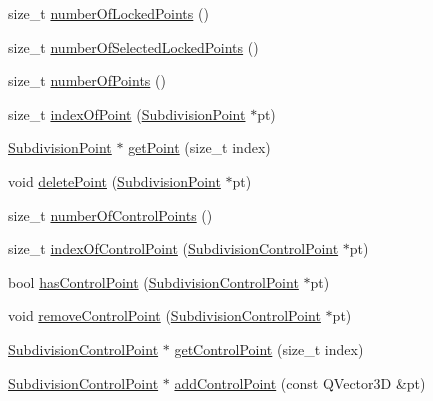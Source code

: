 \begin{DoxyCompactItemize}
\item 
size\-\_\-t \hyperlink{classShipCAD_1_1SubdivisionSurface_a771f0f1881a2da57dde8cb88a8fc9059}{number\-Of\-Locked\-Points} ()
\item 
size\-\_\-t \hyperlink{classShipCAD_1_1SubdivisionSurface_a2583bc0013b5725ac0902062d1c8bcea}{number\-Of\-Selected\-Locked\-Points} ()
\item 
size\-\_\-t \hyperlink{classShipCAD_1_1SubdivisionSurface_a404ffc0c4d13a3a00edb83ad439ee59e}{number\-Of\-Points} ()
\item 
size\-\_\-t \hyperlink{classShipCAD_1_1SubdivisionSurface_a1bde01d6b5972c302ad387cf1247f0fa}{index\-Of\-Point} (\hyperlink{classShipCAD_1_1SubdivisionPoint}{Subdivision\-Point} $\ast$pt)
\item 
\hyperlink{classShipCAD_1_1SubdivisionPoint}{Subdivision\-Point} $\ast$ \hyperlink{classShipCAD_1_1SubdivisionSurface_af07192c8cfc3429ad6da80a1da802a6c}{get\-Point} (size\-\_\-t index)
\item 
void \hyperlink{classShipCAD_1_1SubdivisionSurface_a4117039bfd819cb28ab5cb04296fdcd7}{delete\-Point} (\hyperlink{classShipCAD_1_1SubdivisionPoint}{Subdivision\-Point} $\ast$pt)
\item 
size\-\_\-t \hyperlink{classShipCAD_1_1SubdivisionSurface_a4e184650893ca2ac7e367778ec70c45f}{number\-Of\-Control\-Points} ()
\item 
size\-\_\-t \hyperlink{classShipCAD_1_1SubdivisionSurface_ae0dda53669e5767da6434b3e2f751916}{index\-Of\-Control\-Point} (\hyperlink{classShipCAD_1_1SubdivisionControlPoint}{Subdivision\-Control\-Point} $\ast$pt)
\item 
bool \hyperlink{classShipCAD_1_1SubdivisionSurface_a62abb29703f608a75559452d25db9a33}{has\-Control\-Point} (\hyperlink{classShipCAD_1_1SubdivisionControlPoint}{Subdivision\-Control\-Point} $\ast$pt)
\item 
void \hyperlink{classShipCAD_1_1SubdivisionSurface_aa20b9227481180329e03de8897c52933}{remove\-Control\-Point} (\hyperlink{classShipCAD_1_1SubdivisionControlPoint}{Subdivision\-Control\-Point} $\ast$pt)
\item 
\hyperlink{classShipCAD_1_1SubdivisionControlPoint}{Subdivision\-Control\-Point} $\ast$ \hyperlink{classShipCAD_1_1SubdivisionSurface_a8aa8d3fdfc5e81ba4a39858a69228652}{get\-Control\-Point} (size\-\_\-t index)
\item 
\hyperlink{classShipCAD_1_1SubdivisionControlPoint}{Subdivision\-Control\-Point} $\ast$ \hyperlink{classShipCAD_1_1SubdivisionSurface_af644edd0d4ba993dbab280f036b37171}{add\-Control\-Point} (const Q\-Vector3\-D \&pt)

\end{DoxyCompactItemize}
